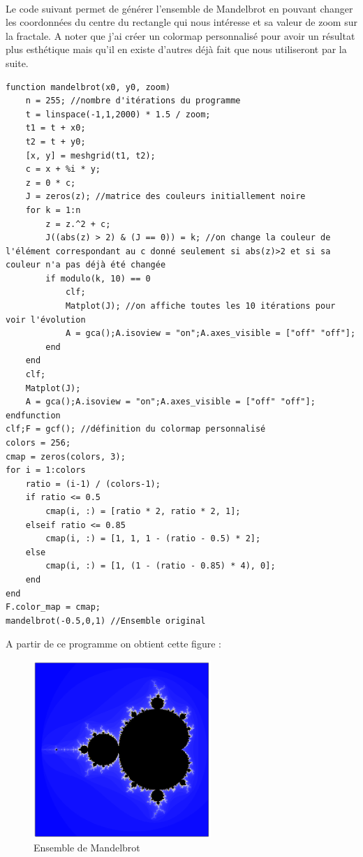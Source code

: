          \\Le code suivant permet de générer l'ensemble de Mandelbrot en pouvant changer les coordonnées du centre du rectangle qui nous intéresse et sa valeur de zoom sur la fractale. A noter que j'ai créer un colormap personnalisé pour avoir un résultat plus esthétique mais qu'il en existe d'autres déjà fait que nous utiliseront par la suite.
         \begin{center}
                \begin{verbatim}
function mandelbrot(x0, y0, zoom)
    n = 255; //nombre d'itérations du programme
    t = linspace(-1,1,2000) * 1.5 / zoom;
    t1 = t + x0;
    t2 = t + y0;
    [x, y] = meshgrid(t1, t2);
    c = x + %i * y;
    z = 0 * c;
    J = zeros(z); //matrice des couleurs initiallement noire
    for k = 1:n
        z = z.^2 + c;
        J((abs(z) > 2) & (J == 0)) = k; //on change la couleur de l'élément correspondant au c donné seulement si abs(z)>2 et si sa couleur n'a pas déjà été changée
        if modulo(k, 10) == 0 
            clf;
            Matplot(J); //on affiche toutes les 10 itérations pour voir l'évolution
            A = gca();A.isoview = "on";A.axes_visible = ["off" "off"];
        end
    end
    clf;
    Matplot(J);
    A = gca();A.isoview = "on";A.axes_visible = ["off" "off"];
endfunction
clf;F = gcf(); //définition du colormap personnalisé
colors = 256;
cmap = zeros(colors, 3);
for i = 1:colors
    ratio = (i-1) / (colors-1);
    if ratio <= 0.5
        cmap(i, :) = [ratio * 2, ratio * 2, 1];
    elseif ratio <= 0.85
        cmap(i, :) = [1, 1, 1 - (ratio - 0.5) * 2];
    else
        cmap(i, :) = [1, (1 - (ratio - 0.85) * 4), 0];
    end
end
F.color_map = cmap;
mandelbrot(-0.5,0,1) //Ensemble original
                \end{verbatim}
                \label{lst:code_4}
         \end{center}
         \newpage
         A partir de ce programme on obtient cette figure :
         \begin{figure}[h]
              \centering
                \includegraphics[width=0.6\textwidth]{images/Mandelbrot.png}
              \caption{Ensemble de Mandelbrot}
              \label{fig:mandel1}
            \end{figure}
